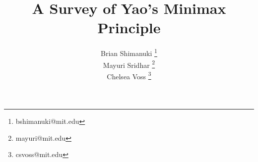 \documentclass[12pt]{article}
\title{A Survey of Yao's Minimax Principle} %
\author{Brian Shimanuki \footnote{bshimanuki@mit.edu} \\
Mayuri Sridhar \footnote{mayuri@mit.edu} \\
Chelsea Voss \footnote{csvoss@mit.edu}}
\begin{document}
\maketitle










\nocite{*}

\end{document}
